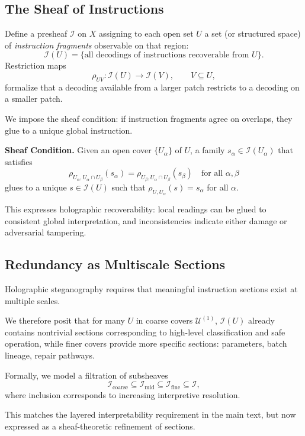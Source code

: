 \documentclass[11pt]{article}
\begin{document}
\subsection{The Sheaf of Instructions}

Define a presheaf $\mathscr{I}$ on $X$ assigning to each open set $U$ a
set (or structured space) of \emph{instruction fragments} observable on
that region:
\[
\mathscr{I}(U) = \{\text{all decodings of instructions recoverable from } U\}.
\]
Restriction maps
\[
\rho_{UV} : \mathscr{I}(U) \to \mathscr{I}(V), \qquad V \subseteq U,
\]
formalize that a decoding available from a larger patch restricts to a
decoding on a smaller patch.

We impose the sheaf condition: if instruction fragments agree on
overlaps, they glue to a unique global instruction.

\medskip
\noindent
\textbf{Sheaf Condition.}
Given an open cover $\{U_\alpha\}$ of $U$, a family
$s_\alpha \in \mathscr{I}(U_\alpha)$ that satisfies
\[
\rho_{U_\alpha, U_\alpha \cap U_\beta}(s_\alpha)
=
\rho_{U_\beta, U_\alpha \cap U_\beta}(s_\beta)
\quad \text{for all } \alpha,\beta
\]
glues to a unique $s \in \mathscr{I}(U)$ such that
$\rho_{U,U_\alpha}(s)=s_\alpha$ for all $\alpha$.

\medskip

This expresses holographic recoverability: local readings can be glued
to consistent global interpretation, and inconsistencies indicate either
damage or adversarial tampering.

\subsection{Redundancy as Multiscale Sections}

Holographic steganography requires that meaningful instruction sections
exist at multiple scales.

We therefore posit that for many $U$ in coarse covers
$\mathcal{U}^{(1)}$, $\mathscr{I}(U)$ already contains nontrivial
sections corresponding to high-level classification and safe operation,
while finer covers provide more specific sections: parameters, batch
lineage, repair pathways.

Formally, we model a filtration of subsheaves
\[
\mathscr{I}_{\text{coarse}} \subseteq
\mathscr{I}_{\text{mid}} \subseteq
\mathscr{I}_{\text{fine}} \subseteq \mathscr{I},
\]
where inclusion corresponds to increasing interpretive resolution.

This matches the layered interpretability requirement in the main text,
but now expressed as a sheaf-theoretic refinement of sections.
\end{document}

